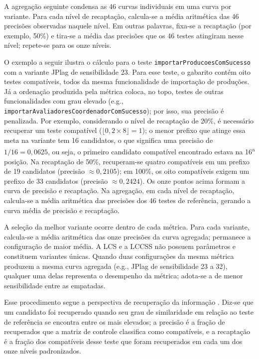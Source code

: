 A agregação seguinte condensa as 46 curvas individuais em uma curva por variante. Para cada nível de recaptação, calcula-se a média aritmética das 46 precisões observadas naquele nível. Em outras palavras, fixa-se a recaptação (por exemplo, 50\%) e tira-se a média das precisões que os 46 testes atingiram nesse nível; repete-se para os onze níveis.

O exemplo a seguir ilustra o cálculo para o teste \texttt{importarProducoesComSucesso} com a variante JPlag de sensibilidade 23. Para esse teste, o gabarito contém oito testes compatíveis, todos da mesma funcionalidade de importação de produções. Já a ordenação produzida pela métrica coloca, no topo, testes de outras funcionalidades com grau elevado (e.g., \texttt{importar\-Avaliadores\-Coordenador\-ComSucesso}); por isso, sua precisão é penalizada. Por exemplo, considerando o nível de recaptação de 20\%, é necessário recuperar um teste compatível ($\lfloor 0{,}2 \times 8 \rfloor = 1$); o menor prefixo que atinge essa meta na variante tem 16 candidatos, o que significa uma precisão de $1/16 = 0{,}0625$, ou seja, o primeiro candidato compatível encontrado estava na 16\textsuperscript{a} posição. Na recaptação de 50\%, recuperam-se quatro compatíveis em um prefixo de 19 candidatos (precisão $\approx 0{,}2105$); em 100\%, os oito compatíveis exigem um prefixo de 33 candidatos (precisão $\approx 0{,}2424$). Os onze pontos acima formam a curva de precisão e recaptação. Na agregação, em cada nível de recaptação, calcula-se a média aritmética das precisões dos 46 testes de referência, gerando a curva média de precisão e recaptação.

A seleção da melhor variante ocorre dentro de cada métrica. Para cada variante, calcula-se a média aritmética das onze precisões da curva agregada; permanece a configuração de maior média. A LCS e a LCCSS não possuem parâmetros e constituem variantes únicas. Quando duas configurações da mesma métrica produzem a mesma curva agregada (e.g., JPlag de sensibilidade 23 a 32), qualquer uma delas representa o desempenho da métrica; adota-se a de menor sensibilidade entre as empatadas.

Esse procedimento segue a perspectiva de recuperação da informação \cite{baezayates:etal:1999}. Diz-se que um candidato foi recuperado quando seu grau de similaridade em relação ao teste de referência se encontra entre os mais elevados; a precisão é a fração de recuperados que a matriz de controle classifica como compatíveis, e a recaptação é a fração dos compatíveis desse teste que foram recuperados em cada um dos onze níveis padronizados.

